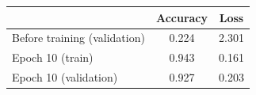\begin{tabular}{lcc}
\toprule
 & Accuracy & Loss \\
\midrule
Before training (validation) & 0.224 & 2.301 \\
Epoch 10 (train) & 0.943 & 0.161 \\
Epoch 10 (validation) & 0.927 & 0.203 \\
\bottomrule
\end{tabular}
